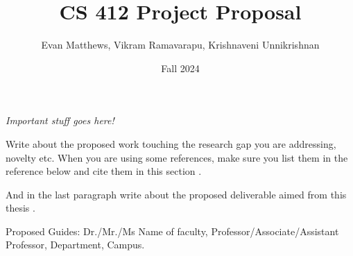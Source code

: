 \documentclass[12pt]{extarticle}
\title{CS 412 Project Proposal}
\author{Evan Matthews, Vikram Ramavarapu, Krishnaveni Unnikrishnan}
\date{Fall 2024}
\begin{document}
\maketitle

\textit{Important stuff goes here!}

Write about the proposed work touching the research gap you are addressing, novelty etc. When you are using some references, make sure you list them in the reference below and cite them in this section \cite{Linhart2014} \cite{Linhart2008}.

And in the last paragraph write about the proposed deliverable aimed from this thesis  \cite{fractalwiki}.

Proposed Guides: Dr./Mr./Ms Name of faculty, Professor/Associate/Assistant Professor, Department, Campus.  \nocite{higham1998handbook}




\end{document}
